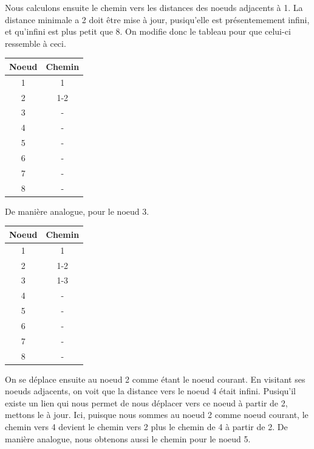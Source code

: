 \documentclass[12pt]{article}
\begin{document}
Nous calculons ensuite le chemin vers les distances des noeuds adjacents à 1. La distance minimale a 2 doit être mise à jour, pusiqu'elle est présentemement infini, et qu'infini est plus petit que 8. On modifie donc le tableau pour que celui-ci ressemble à ceci.

\begin{center}
	\begin{tabular}{||c c||}
		\hline
		Noeud & Chemin \\ [0.5ex]
		\hline\hline
		1 & 1 \\
		\hline
		2 & 1-2 \\
		\hline
		3 & - \\
		\hline
		4 & - \\
		\hline
		5 & -  \\
		\hline
		6 & -  \\
		\hline
		7 & -  \\
		\hline
		8 & -  \\ [1ex]
		\hline
	\end{tabular}
\end{center}

De manière analogue, pour le noeud 3.

\begin{center}
	\begin{tabular}{||c c||}
		\hline
		Noeud & Chemin \\ [0.5ex]
		\hline\hline
		1 & 1 \\
		\hline
		2 & 1-2 \\
		\hline
		3 & 1-3 \\
		\hline
		4 & - \\
		\hline
		5 & -  \\
		\hline
		6 & -  \\
		\hline
		7 & -  \\
		\hline
		8 & -  \\ [1ex]
		\hline
	\end{tabular}
\end{center}

On se déplace ensuite au noeud 2 comme étant le noeud courant. En visitant ses noeuds adjacents, on voit que la distance vers le noeud 4 était infini. Pusiqu'il existe un lien qui nous permet de nous déplacer vers ce noeud à partir de 2, mettons le à jour. Ici, puisque nous sommes au noeud 2 comme noeud courant, le chemin vers 4 devient le chemin vers 2 plus le chemin de 4 à partir de 2. De manière analogue, nous obtenons aussi le chemin pour le noeud 5.
\end{document}
